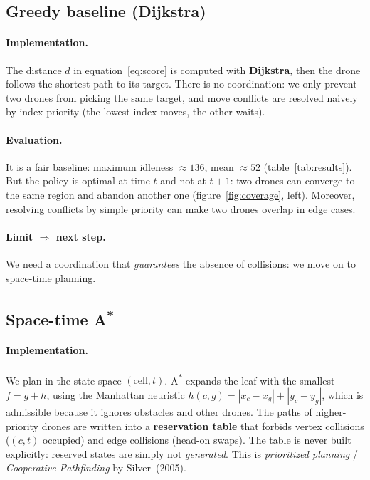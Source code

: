 \documentclass[11pt,a4paper]{article}
\begin{document}
\subsection{Greedy baseline (Dijkstra)}

\paragraph{Implementation.} The distance $d$ in equation~\eqref{eq:score} is
computed with \textbf{Dijkstra}, then the drone follows the shortest path to its
target. There is no coordination: we only prevent two drones from picking the
same target, and move conflicts are resolved naively by index priority (the
lowest index moves, the other waits).

\paragraph{Evaluation.} It is a fair baseline: maximum idleness $\approx 136$,
mean $\approx 52$ (table~\ref{tab:results}). But the policy is optimal at time
$t$ and not at $t+1$: two drones can converge to the same region and abandon
another one (figure~\ref{fig:coverage}, left). Moreover, resolving conflicts by
simple priority can make two drones overlap in edge cases.

\paragraph{Limit $\Rightarrow$ next step.} We need a coordination that
\emph{guarantees} the absence of collisions: we move on to space-time planning.

\subsection{Space-time A\texorpdfstring{\textsuperscript{*}}{*}}

\paragraph{Implementation.} We plan in the state space $(\text{cell}, t)$.
A\textsuperscript{*} expands the leaf with the smallest $f = g + h$, using the
Manhattan heuristic $h(c,g)=|x_c-x_g|+|y_c-y_g|$, which is admissible because it
ignores obstacles and other drones. The paths of higher-priority drones are
written into a \textbf{reservation table} that forbids vertex collisions
($(c,t)$ occupied) and edge collisions (head-on swaps). The table is never built
explicitly: reserved states are simply not \emph{generated}. This is
\emph{prioritized planning} / \emph{Cooperative Pathfinding} by Silver~(2005).
\end{document}

